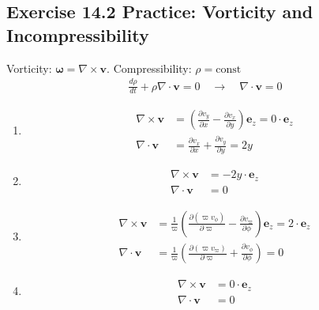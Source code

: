 \documentclass[10pt,a4paper]{book}
\theoremstyle{definition}
\begin{document}
\subsection{Exercise 14.2 Practice: Vorticity and Incompressibility}
Vorticity: $\boldsymbol\omega=\nabla\times\mathbf{v}$. Compressibility: $\rho=\text{const}$
\begin{align}
    \frac{d\rho}{dt}+\rho\nabla\cdot\mathbf{v}=0\quad\rightarrow\quad\nabla\cdot\mathbf{v}=0
\end{align}
\begin{enumerate}[label=(\alph*)]
    \item 
    \begin{align}
        \nabla\times\mathbf{v} &=\left(\frac{\partial v_y}{\partial x}-\frac{\partial v_x}{\partial y}\right)\mathbf{e}_z= 0\cdot\mathbf{e}_z\\
        \nabla\cdot\mathbf{v} &= \frac{\partial v_x}{\partial x}+\frac{\partial v_y}{\partial y}=2y
    \end{align}
    \item 
    \begin{align}
        \nabla\times\mathbf{v} &= -2y\cdot\mathbf{e}_z\\
        \nabla\cdot\mathbf{v} &= 0
    \end{align}
    \item 
    \begin{align}
        \nabla\times\mathbf{v} &= \frac{1}{\varpi}\left(\frac{\partial (\varpi v_\phi)}{\partial \varpi}-\frac{\partial v_\varpi}{\partial \phi}\right)\mathbf{e}_z= 2\cdot\mathbf{e}_z\\
        \nabla\cdot\mathbf{v} &= \frac{1}{\varpi}\left(\frac{\partial (\varpi v_\varpi)}{\partial \varpi}+\frac{\partial v_\phi}{\partial \phi}\right)=0
    \end{align}
    \item 
    \begin{align}
        \nabla\times\mathbf{v} &=  0\cdot\mathbf{e}_z\\
        \nabla\cdot\mathbf{v} &= 0
    \end{align}
\end{enumerate}
\end{document}
